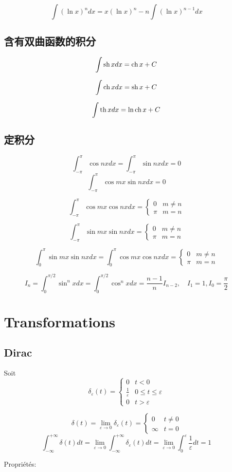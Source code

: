 $$
\int (\ln x)^n dx=x(\ln x)^n -n \int (\ln x)^{n-1}dx
$$
\subsection{含有双曲函数的积分}
$$
\int \operatorname{sh} xdx=\operatorname{ch} x+C
$$

$$
\int \operatorname{ch} xdx=\operatorname{sh} x+C
$$

$$
\int \operatorname{th} xdx=\ln \operatorname{ch} x+C
$$
\subsection{定积分}
$$
\int_{-\pi}^{\pi} \cos nx dx=
\int_{-\pi}^{\pi} \sin nx dx=0
$$
$$
\int_{-\pi}^{\pi} \cos mx\sin nx dx=0
$$

$$
\int_{-\pi}^{\pi} \cos mx\cos nx dx=
\left\{
		\begin{array}{ll}
		 0 & m \neq n \\
		 \pi & m = n
		\end{array}
		\right.
$$

$$
\int_{-\pi}^{\pi} \sin mx\sin nx dx=
\left\{
		\begin{array}{ll}
		 0 & m \neq n \\
		 \pi & m = n
		\end{array}
		\right.
$$

$$
\int_{0}^{\pi} \sin mx\sin nx dx=
\int_{0}^{\pi} \cos mx\cos nx dx=
\left\{
		\begin{array}{ll}
		 0 & m \neq n \\
		 \pi & m = n
		\end{array}
		\right.
$$

$$
I_n=\int_{0}^{\pi/2} \sin^n xdx=\int_{0}^{\pi/2}\cos^n xdx=\frac{n-1}{n}I_{n-2},\quad
I_1=1, I_0=\frac{ \pi}{2}
$$

\section{Transformations}
\subsection{Dirac}
Soit
\begin{equation}
		 \delta _{\varepsilon}(t)=
\left\{
		\begin{array}{ll}
		0 & t<0 \\
		\frac{ 1}{\varepsilon} & 0\leq t \leq \varepsilon \\
		0 & t> \varepsilon
		\end{array}
		\right.
\end{equation}
\begin{definition}
\begin{equation}
\delta (t)=\lim_{\varepsilon \to 0}\delta _{\varepsilon}(t)=
\left\{
		\begin{array}{ll}
		 0 & t\neq 0 \\
		 \infty & t=0
		\end{array}
		\right.
\end{equation}
$$
\int_{-\infty}^{+\infty}\delta (t)dt
=\lim_{\varepsilon \to 0}\int_{-\infty}^{+\infty} \delta_{\varepsilon}(t)dt
=\lim_{\varepsilon \to 0}\int_{0}^{\varepsilon}\frac{1}{\varepsilon}dt
=1
$$
\end{definition}
Propri\'et\'es:

